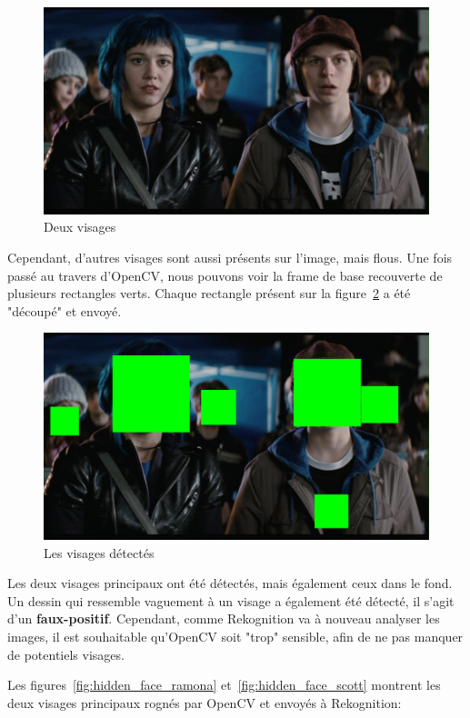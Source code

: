 \begin{figure}[H]
	\centering
	\includegraphics[width=12cm]{images/facial_reco/scott.jpg}
    \caption{Deux visages}
	\label{fig:scott}
\end{figure}

Cependant, d'autres visages sont aussi présents sur l'image, mais flous. 
Une fois passé au travers d'OpenCV, nous pouvons voir la frame de base recouverte de plusieurs rectangles verts.
Chaque rectangle présent sur la figure~\ref{fig:hidden_face} a été "découpé" et envoyé.

\begin{figure}[H]
	\centering
	\includegraphics[width=12cm]{images/facial_reco/hidden_face.png}
    \caption{Les visages détectés}
	\label{fig:hidden_face}
\end{figure}

Les deux visages principaux ont été détectés, mais également ceux dans le fond.
Un dessin qui ressemble vaguement à un visage a également été détecté, il s'agit d'un \textbf{faux-positif}.
Cependant, comme Rekognition va à nouveau analyser les images, il est souhaitable qu'OpenCV
soit "trop" sensible, afin de ne pas manquer de potentiels visages.

Les figures~\ref{fig:hidden_face_ramona} et~\ref{fig:hidden_face_scott} montrent les deux visages principaux rognés par OpenCV et envoyés à Rekognition:

